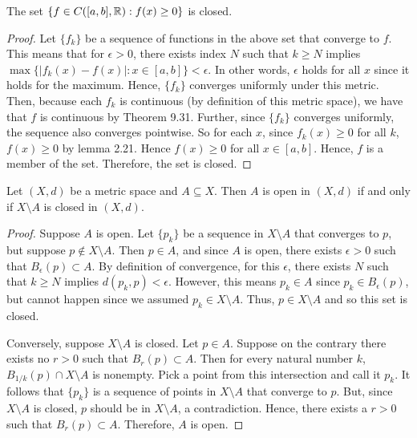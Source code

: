 \documentclass[letterpaper, twoside, 12pt]{book}
\begin{document}
\begin{example}[12.11]
  The set \(\{f\in C([a,b],\mathbb R):f(x)\geq 0\}\) is closed.
\end{example}

\begin{proof}
    Let \(\{f_k\}\) be a sequence of functions in the above set
    that converge to \(f\). This means that for \(\epsilon > 0\),
    there exists index \(N\) such that \(k \geq N\) implies
    \( \max\{ |f_k(x) - f(x)| : x \in [a,b] \}  < \epsilon \). In
    other words, \(\epsilon\) holds for all \(x\) since it holds
    for the maximum. Hence, \(\{f_k\}\) converges uniformly 
    under this metric. Then, because each \(f_k\) is continuous
    (by definition of this metric space), we have that \(f\) is
    continuous by Theorem 9.31. Further, since \(\{f_k\}\) converges
    uniformly, the sequence also converges pointwise. So for each
    \(x\), since \(f_k(x) \geq 0\) for all \(k\), \(f(x) \geq 0\)
    by lemma 2.21. Hence \(f(x) \geq 0\) for all \(x \in [a,b]\).
    Hence, \(f\) is a member of the set. Therefore, the set is closed.
\end{proof}

\begin{theorem}
  Let \((X,d)\) be a metric space and \(A\subseteq X\). Then \(A\) is
  open in \((X,d)\) if and only if \(X\setminus A\) is closed in \((X,d)\).
\end{theorem}

\begin{proof}
    Suppose \(A\) is open. Let \(\{p_k\}\) be a sequence in \(X \setminus A\)
    that converges to \(p\), but suppose \(p \not\in X \setminus A\).
    Then \(p \in A\), and since \(A\) is open, there exists \(\epsilon > 0\)
    such that \(B_{\epsilon}(p) \subset A\). By definition of
    convergence, for this \(\epsilon\), there exists \(N\) such that \(k \geq N\) implies
    \(d(p_k, p) < \epsilon\). However, this means \(p_k \in A\) since
    \(p_k \in B_{\epsilon}(p)\), but cannot happen since we assumed
    \(p_k \in X \setminus A\). Thus, \(p \in X \setminus A\) and so this
    set is closed.

    Conversely, suppose \(X \setminus A\) is closed. Let \(p \in A\). 
    Suppose on the contrary there exists no \(r > 0\) such that
    \(B_r(p) \subset A\). Then for every natural number \(k\), 
    \(B_{1/k}(p) \cap X \setminus A\) is nonempty. Pick a point from
    this intersection and call it \(p_k\). It follows that \(\{p_k\}\)
    is a sequence of points in \(X \setminus A\) that converge to 
    \(p\). But, since \(X \setminus A\) is closed, \(p\) should be in 
    \(X \setminus A\), a contradiction. Hence, there exists a \(r > 0\) such that
    \(B_r(p) \subset A\). Therefore, \(A\) is open.
\end{proof}
\end{document}
